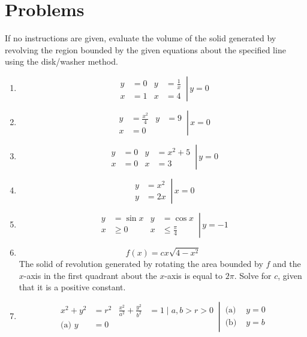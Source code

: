\documentclass[12pt, A4]{report}
\begin{document}
		\section*{Problems}
			If no instructions are given, evaluate the volume of the solid generated by revolving the region bounded by the given equations about the specified line using the disk/washer method.
			\begin{enumerate}
				\item
					\[
						\left.\begin{aligned}
							y &= 0 &
								y &= \frac{1}{x} \\
							x &= 1 &
								x &= 4
						\end{aligned}\,\right|\, y = 0
					\]
				\item
					\[
						\left.\begin{aligned}
							y &= \frac{x^2}{4} &
								y &= 9 \\
							x &= 0
						\end{aligned}\,\right|\, x = 0
					\]
				\item
					\[
						\left.\begin{aligned}
							y &= 0 & 
								y &= x^2 + 5 \\
							x &= 0 &
								x &= 3
						\end{aligned}\,\right|\, y = 0
					\]
				\item
					\[
						\left.\begin{aligned}
							y &= x^2 \\
							y &= 2x 
						\end{aligned}\,\right|\, x = 0
					\]
				\item
					\[
						\left.\begin{aligned}
							y &= \sin x &
								y &= \cos x \\
							x &\ge 0 & 
								x &\le \frac{\pi}{4}
						\end{aligned}\,\right|\, y = -1
					\]
				\item
					\[f(x) = cx\sqrt{4 - x^2}\]
					The solid of revolution generated by rotating the area bounded by $f$ and the $x$-axis in the first quadrant about the $x$-axis is equal to $2\pi$. Solve for $c$, given that it is a positive constant.
				\item
					\[
						\left.\begin{aligned}
							x^2 + y^2 &= r^2 & 
								\frac{x^2}{a^2} + \frac{y^2}{b^2} &= 1 
								\mid a, b > r > 0\\
							\text{(a) } y &= 0
						\end{aligned}\,\right|\,
						\begin{aligned}
							\text{(a) } &y = 0 \\
							\text{(b) } &y = b
						\end{aligned}
					\]
			\end{enumerate}
			\newpage
\end{document}
